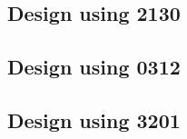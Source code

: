 
 \begin{center}




 \end{center}



\subsection{Design using 2130}


 \begin{center}




 \end{center}



\subsection{Design using 0312}


 \begin{center}




 \end{center}



\subsection{Design using 3201}


